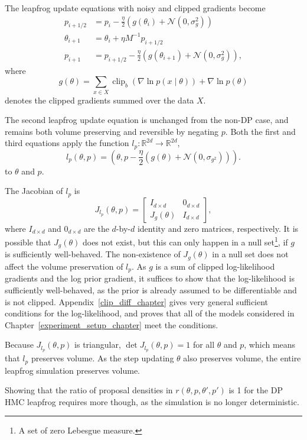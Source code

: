 \documentclass[english,twoside,openright]{HYgraduMLDS}
\newcommand{\R}{\mathbb{R}}
\newcommand{\caln}{{\mathcal{N}}}
\DeclareMathOperator{\clip}{clip}
\begin{document}
The leapfrog update equations with noisy and clipped gradients become
\begin{align*}
  p_{i+1/2} &= p_{i} - \frac{\eta}{2}(g(\theta_{i}) + \caln(0, \sigma_{g}^{2})) \\
  \theta_{i+1} &= \theta_{i} + \eta M^{-1}p_{i+1/2} \\
  p_{i+1} &= p_{i+1/2} - \frac{\eta}{2}(g(\theta_{i+1}) + \caln(0, \sigma_{g}^{2})),
\end{align*}
where
\[
  g(\theta) = \sum_{x\in X}\clip_{b}(\nabla \ln p(x\mid \theta)) + \nabla\ln p(\theta)
\]
denotes the clipped gradients summed over the data \(X\).

The second leapfrog update equation is unchanged from the non-DP case,
and remains both volume preserving and reversible
by negating \(p\). Both the first and third equations apply the function
\(l_{p}\colon \R^{2d}\to \R^{2d}\),
\[
  l_{p}(\theta, p) = \left(\theta, p - \frac{\eta}{2}(g(\theta)
    + \caln(0, \sigma_{g^{2}}))\right).
\]
to \(\theta\) and \(p\).

The Jacobian of \(l_{p}\) is
\[
  J_{l_{p}}(\theta, p) =
  \begin{bmatrix}
    I_{d\times d} & 0_{d\times d} \\
    J_{g}(\theta) & I_{d\times d}
  \end{bmatrix},
\]
where \(I_{d\times d}\) and \(0_{d\times d}\) are the \(d\)-by-\(d\) identity and
zero matrices, respectively.
It is possible that \(J_{g}(\theta)\) does not exist, but this can only happen
in a null set\footnote{A set of zero Lebesgue measure.}, if \(g\) is
sufficiently well-behaved. The non-existence of \(J_{g}(\theta)\) in a null set
does not affect the volume preservation of \(l_{p}\).
As \(g\) is a sum of clipped log-likelihood
gradients and the log prior gradient, it suffices to show that the
log-likelihood is sufficiently well-behaved, as the prior is already assumed
to be differentiable and is not clipped. Appendix~\ref{clip_diff_chapter}
gives very general sufficient conditions for the log-likelihood, and proves
that all of the models considered in Chapter~\ref{experiment_setup_chapter} meet
the conditions.

Because \(J_{l_{p}}(\theta, p)\) is triangular, \(\det J_{l_{p}}(\theta, p) = 1\)
for all \(\theta\) and \(p\), which means that \(l_{p}\) preserves volume.
As the step updating \(\theta\) also preserves volume, the entire leapfrog
simulation preserves volume.

Showing that the ratio of proposal densities in \(r(\theta, p, \theta', p')\)
is 1
for the DP HMC leapfrog requires more though, as the simulation is no longer
deterministic.
\end{document}
